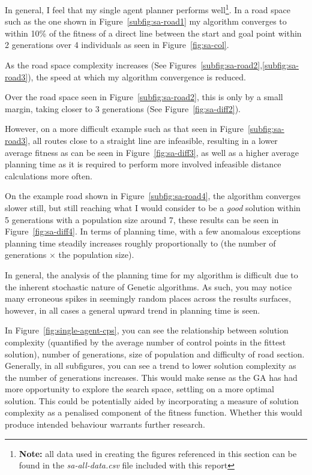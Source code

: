 In general, I feel that my single agent planner performs well\footnote{\textbf{Note:} all data used in creating the figures referenced in this section can be found in the \textit{sa-all-data.csv} file included with this report }. In a road space such as the one shown in Figure~\ref{subfig:sa-road1} my algorithm converges to within 10\% of the fitness of a direct line between the start and goal point within 2 generations over 4 individuals as seen in Figure~\ref{fig:sa-col}.

As the road space complexity increases (See Figures~\ref{subfig:sa-road2},\ref{subfig:sa-road3}), the speed at which my algorithm convergence is reduced.

Over the road space seen in Figure~\ref{subfig:sa-road2}, this is only by a small margin, taking closer to 3 generations (See Figure~\ref{fig:sa-diff2}).

However, on a more difficult example such as that seen in Figure~\ref{subfig:sa-road3}, all routes close to a straight line are infeasible, resulting in a lower average fitness as can be seen in Figure~\ref{fig:sa-diff3}, as well as a higher average planning time as it is required to perform more involved infeasible distance calculations more often.

On the example road shown in Figure~\ref{subfig:sa-road4}, the algorithm converges slower still, but still reaching what I would consider to be a \textit{good} solution within 5 generations with a population size around 7, these results can be seen in Figure~\ref{fig:sa-diff4}. In terms of planning time, with a few anomalous exceptions planning time steadily increases roughly proportionally to (the number of generations $\times$ the population size).

In general, the analysis of the planning time for my algorithm is difficult due to the inherent stochastic nature of Genetic algorithms. As such, you may notice many erroneous spikes in seemingly random places across the results surfaces, however, in all cases a general upward trend in planning time is seen.

In Figure~\ref{fig:single-agent-cps}, you can see the relationship between solution complexity (quantified by the average number of control points in the fittest solution), number of generations, size of population and difficulty of road section. Generally, in all subfigures, you can see a trend to lower solution complexity as the number of generations increases. This would make sense as the GA has had more opportunity to explore the search space, settling on a more optimal solution. This could be potentially aided by incorporating a measure of solution complexity as a penalised component of the fitness function. Whether this would produce intended behaviour warrants further research.

